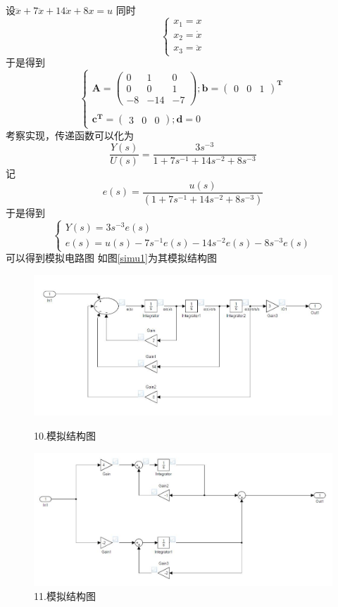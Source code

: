 \documentclass[UTF8,a4paper]{ctexart}
\begin{document}
\section{}
设$\dddot{x}+7\ddot{x}+14\dot{x}+8x=u$
同时$$\begin{cases} x_1=x \\ x_2=\dot{x} \\ x_3=\ddot{x} \end{cases}$$
于是得到$$\begin{cases}
\mathbf{A}=\begin{pmatrix} 
0 & 1 & 0 \\
0 & 0 & 1  \\
-8& -14& -7 \end{pmatrix} ;
\mathbf{b}=\begin{pmatrix} 0 & 0 & 1 \end{pmatrix}^\mathbf{T}\\ \\
\mathbf{c^T}=\begin{pmatrix} 3 & 0 & 0 \end{pmatrix} ;
\mathbf{d}=0 \end{cases}$$
考察实现，传递函数可以化为
$$\frac{Y(s)}{U(s)}=\frac{3s^{-3}}{1+7s^{-1}+14s^{-2}+8s^{-3}}$$记$$e(s)=\frac{u(s)}{(1+7s^{-1}+14s^{-2}+8s^{-3})}$$
于是得到
$$\begin{cases}Y(s)=3s^{-3}e(s)\\ e(s)=u(s)-7s^{-1}e(s)-14s^{-2}e(s)-8s^{-3}e(s)\end{cases}$$可以得到模拟电路图
如图\ref{simu1}为其模拟结构图
\begin{figure}
\centering
\includegraphics[width=\textwidth]{Simu1.JPG}
\caption{10.模拟结构图}
\label{simu1}
\includegraphics[width=\textwidth]{Simu2.JPG}
\caption{11.模拟结构图}
\label{simu2}
\end{figure}
\end{document}
